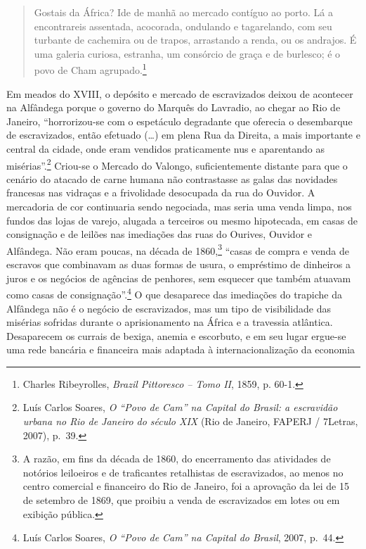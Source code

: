 \begin{quote}
Gostais da África? Ide de manhã ao mercado contíguo ao porto. Lá a
encontrareis assentada, acocorada, ondulando e tagarelando, com seu
turbante de cachemira ou de trapos, arrastando a renda, ou os andrajos.
É uma galeria curiosa, estranha, um consórcio de graça e de burlesco; é
o povo de Cham agrupado.\footnote{Charles Ribeyrolles, \emph{Brazil
  Pittoresco -- Tomo II}, 1859, p. 60-1.}
\end{quote}

Em meados do XVIII, o depósito e mercado de escravizados deixou de
acontecer na Alfândega porque o governo do Marquês do Lavradio, ao
chegar ao Rio de Janeiro, ``horrorizou-se com o espetáculo degradante
que oferecia o desembarque de escravizados, então efetuado (\ldots{}) em
plena Rua da Direita, a mais importante e central da cidade, onde eram
vendidos praticamente nus e aparentando as misérias''.\footnote{Luís
  Carlos Soares, \emph{O ``Povo de Cam'' na Capital do Brasil: a
  escravidão urbana no Rio de Janeiro do século XIX} (Rio de Janeiro,
  FAPERJ / 7Letras, 2007), p.~39.} Criou-se o Mercado do Valongo,
suficientemente distante para que o cenário do atacado de carne humana
não contrastasse as galas das novidades francesas nas vidraças e a
frivolidade desocupada da rua do Ouvidor. A mercadoria de cor
continuaria sendo negociada, mas seria uma venda limpa, nos fundos das
lojas de varejo, alugada a terceiros ou mesmo hipotecada, em casas de
consignação e de leilões nas imediações das ruas do Ourives, Ouvidor e
Alfândega. Não eram poucas, na década de 1860,\footnote{A razão, em fins
  da década de 1860, do encerramento das atividades de notórios
  leiloeiros e de traficantes retalhistas de escravizados, ao menos no
  centro comercial e financeiro do Rio de Janeiro, foi a aprovação da
  lei de 15 de setembro de 1869, que proibiu a venda de escravizados em
  lotes ou em exibição pública.} ``casas de compra e venda de escravos
que combinavam as duas formas de usura, o empréstimo de dinheiros a
juros e os negócios de agências de penhores, sem esquecer que também
atuavam como casas de consignação''.\footnote{Luís Carlos Soares,
  \emph{O ``Povo de Cam'' na Capital do Brasil}, 2007, p.~44.} O que
desaparece das imediações do trapiche da Alfândega não é o negócio de
escravizados, mas um tipo de visibilidade das misérias sofridas durante
o aprisionamento na África e a travessia atlântica. Desaparecem os
currais de bexiga, anemia e escorbuto, e em seu lugar ergue-se uma rede
bancária e financeira mais adaptada à internacionalização da economia
